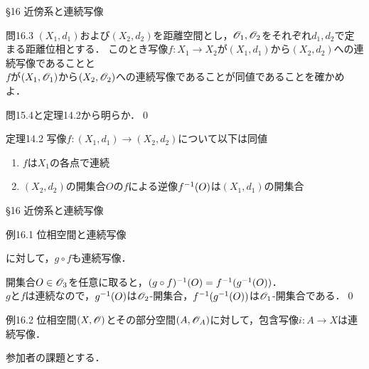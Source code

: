 \documentclass[uplatex,a4paper,dvipdfmx,aspectratio=169,11pt]{beamer}
\begin{document}
\begin{frame}[fragile]{\S 16 近傍系と連続写像}
    \begin{exampleblock}{問16.3}
        $(X_1, d_1)$および$(X_2, d_2)$を距離空間とし，$\mathscr{O}_1, \mathscr{O}_2$をそれぞれ$d_1, d_2$で定まる距離位相とする．
        このとき写像$f \colon X_1 \to X_2$が$(X_1, d_1)$から$(X_2, d_2)$への連続写像であることと\\$f$が$(X_1, \mathscr{O}_1)$から$(X_2, \mathscr{O}_2)$への連続写像であることが同値であることを確かめよ．
    \end{exampleblock}
    \medskip{}

     \quad 問15.4と定理14.2から明らか．\qed

    \medskip{}
    \begin{block}{定理14.2}
        写像$f \colon (X_1, d_1) \to (X_2, d_2)$について以下は同値
        \begin{enumerate}
            \item $f$は$X_1$の各点で連続
            \item[2.] $(X_2, d_2)$の開集合$O$の$f$による逆像$f^{\mathrm{-1}}(O)$は$(X_1, d_1)$の開集合
        \end{enumerate}
    \end{block}
\end{frame}

\begin{frame}[fragile]{\S 16 近傍系と連続写像}
    \begin{exampleblock}{例16.1}
        位相空間と連続写像に対して，$g \circ f$も連続写像．
    \end{exampleblock}

    \medskip{}


    \medskip{}

    開集合$O \in \mathscr{O}_3$を任意に取ると，$(g \circ f)^{\mathrm{-1}}(O) = f^{\mathrm{-1}}(g^{\mathrm{-1}}(O))$．\\
    $g$と$f$は連続なので，$g^{\mathrm{-1}}(O)$は$\mathscr{O}_2$-開集合，$f^{\mathrm{-1}}(g^{\mathrm{-1}}(O))$は$\mathscr{O}_1$-開集合である．\qed

    \medskip{}

    \begin{exampleblock}{例16.2}
        位相空間$(X, \mathscr{O})$とその部分空間$(A, \mathscr{O}_A)$に対して，包含写像$i \colon A \to X$は連続写像．
    \end{exampleblock}
    \medskip{}

     \quad 参加者の課題とする．
\end{frame}
\end{document}
